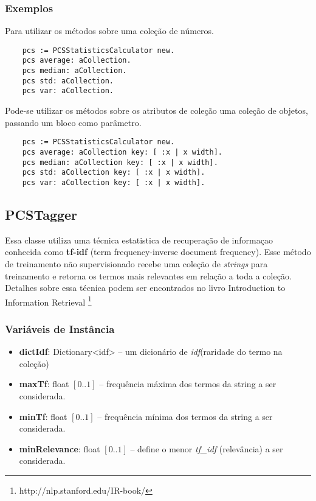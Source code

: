 \subsubsection{Exemplos}
Para utilizar os métodos sobre uma coleção de números.
    \begin{verbatim}
    pcs := PCSStatisticsCalculator new.
    pcs average: aCollection.
    pcs median: aCollection.
    pcs std: aCollection.
    pcs var: aCollection.
    \end{verbatim}

Pode-se utilizar os métodos sobre os atributos de coleção uma coleção de objetos, passando um
bloco como parâmetro.
    \begin{verbatim}
    pcs := PCSStatisticsCalculator new.
    pcs average: aCollection key: [ :x | x width].
    pcs median: aCollection key: [ :x | x width].
    pcs std: aCollection key: [ :x | x width].
    pcs var: aCollection key: [ :x | x width].
    \end{verbatim}


    
\subsection{PCSTagger}

Essa classe utiliza uma técnica estatistica de recuperação de informaçao conhecida como \textbf{tf-idf} 
(term frequency-inverse document frequency). Esse método de treinamento não supervisionado recebe uma coleção de
\textit{strings} para treinamento e retorna os termos mais relevantes em relação a toda a coleção. 
Detalhes sobre essa técnica podem ser encontrados no livro Introduction to Information Retrieval
\footnote{http://nlp.stanford.edu/IR-book/}

\subsubsection{Variáveis de Instância}
    
\begin{itemize}
    \item \textbf{dictIdf}: Dictionary<idf> -- um dicionário de \textit{idf}(raridade do termo na
                   coleção)
    \item \textbf{maxTf}: float $[0..1]$ -- frequência máxima dos termos da string a ser considerada.
    \item \textbf{minTf}: float $[0..1]$ -- frequência mínima dos termos da string a ser considerada.
    \item \textbf{minRelevance}: float $[0..1]$ --  define o menor \textit{tf\_idf} (relevância) a ser
                        considerada.
\end{itemize}

